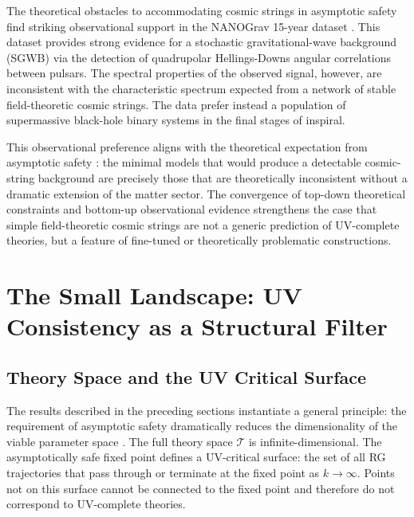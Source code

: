 \documentclass[12pt,a4paper]{article}
\begin{document}
The theoretical obstacles to accommodating cosmic strings in asymptotic safety
find striking observational support in the NANOGrav 15-year dataset
\cite{NANOGrav2023}. This dataset provides strong evidence for a stochastic
gravitational-wave background (SGWB) via the detection of quadrupolar
Hellings-Downs angular correlations between pulsars. The spectral properties
of the observed signal, however, are inconsistent with the characteristic
spectrum expected from a network of stable field-theoretic cosmic strings.
The data prefer instead a population of supermassive black-hole binary systems
in the final stages of inspiral.

This observational preference aligns with the theoretical expectation from
asymptotic safety \cite{EichhornLinoMiqueleto2023}: the minimal models that
would produce a detectable cosmic-string background are precisely those that
are theoretically inconsistent without a dramatic extension of the matter
sector. The convergence of top-down theoretical constraints and bottom-up
observational evidence strengthens the case that simple field-theoretic cosmic
strings are not a generic prediction of UV-complete theories, but a feature
of fine-tuned or theoretically problematic constructions.

\section{The Small Landscape: UV Consistency as a Structural Filter}

\subsection{Theory Space and the UV Critical Surface}

The results described in the preceding sections instantiate a general principle:
the requirement of asymptotic safety dramatically reduces the dimensionality
of the viable parameter space \cite{Weinberg1979,ReuterSaueressig2012}. The
full theory space $\mathcal{T}$ is infinite-dimensional. The asymptotically
safe fixed point defines a UV-critical surface: the set of all RG trajectories
that pass through or terminate at the fixed point as $k \to \infty$. Points
not on this surface cannot be connected to the fixed point and therefore do
not correspond to UV-complete theories.
\end{document}
